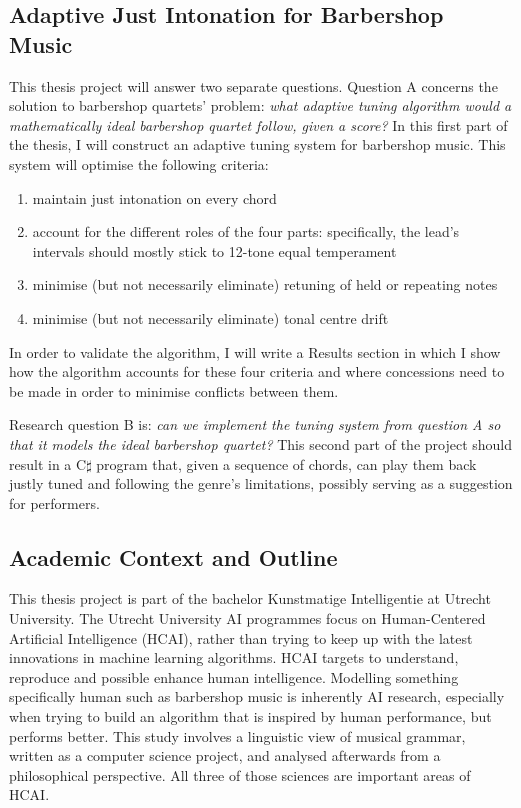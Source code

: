 \documentclass[a4paper]{article}
\begin{document}
\subsection{Adaptive Just Intonation for Barbershop Music}
\label{intro_aji_for_bs}
This thesis project will answer two separate questions. Question A concerns the solution to barbershop quartets' problem: {\it what adaptive tuning algorithm would a mathematically ideal barbershop quartet follow, given a score?} In this first part of the thesis, I will construct an adaptive tuning system for barbershop music. This system will optimise the following criteria:
\begin{enumerate}
	\item maintain just intonation on every chord
	\item account for the different roles of the four parts: specifically, the lead's intervals should mostly stick to 12-tone equal temperament
	\item minimise (but not necessarily eliminate) retuning of held or repeating notes
	\item minimise (but not necessarily eliminate) tonal centre drift
\end{enumerate}
In order to validate the algorithm, I will write a Results section in which I show how the algorithm accounts for these four criteria and where concessions need to be made in order to minimise conflicts between them.

Research question B is: {\it can we implement the tuning system from question A so that it models the ideal barbershop quartet?} This second part of the project should result in a C$\sharp$ program that, given a sequence of chords, can play them back justly tuned and following the genre's limitations, possibly serving as a suggestion for performers.

\subsection{Academic Context and Outline}
This thesis project is part of the bachelor Kunstmatige Intelligentie at Utrecht University. The Utrecht University AI programmes focus on Human-Centered Artificial Intelligence (HCAI), rather than trying to keep up with the latest innovations in machine learning algorithms. HCAI targets to understand, reproduce and possible enhance human intelligence.\cite{noauthor_human-centered_2023} Modelling something specifically human such as barbershop music is inherently AI research, especially when trying to build an algorithm that is inspired by human performance, but performs better. This study involves a linguistic view of musical grammar, written as a computer science project, and analysed afterwards from a philosophical perspective. All three of those sciences are important areas of HCAI.
\end{document}

